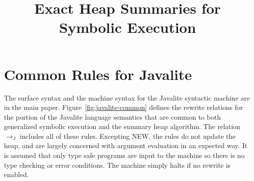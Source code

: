 \documentclass[pldi]{sigplanconf-pldi15}
\newcommand{\figref}[1]{Figure~\ref{#1}}
\newcommand{\com}{\ensuremath{J}}
\newcommand{\rcom}{\ensuremath{\rightarrow_\com}}
\begin{document}




\title{Exact Heap Summaries for Symbolic Execution}


\maketitle

\begin{abstract}

\end{abstract}



%


%


%

\section{Common Rules for Javalite}


The surface syntax and the machine syntax for the Javalite syntactic
machine are in the main paper. \figref{fig:javalite-common} defines
the rewrite relations for the portion of the Javalite language
semantics that are common to both generalized symbolic execution and
the summary heap algorithm. The relation $\rcom$ includes all of these
rules. Excepting \textrm{N{\footnotesize EW}}, the rules do not update
the heap, and are largely concerned with argument evaluation in an
expected way. It is assumed that only type safe programs are input to
the machine so there is no type checking or error conditions. The
machine simply halts if no rewrite is enabled.

	




\end{document}
